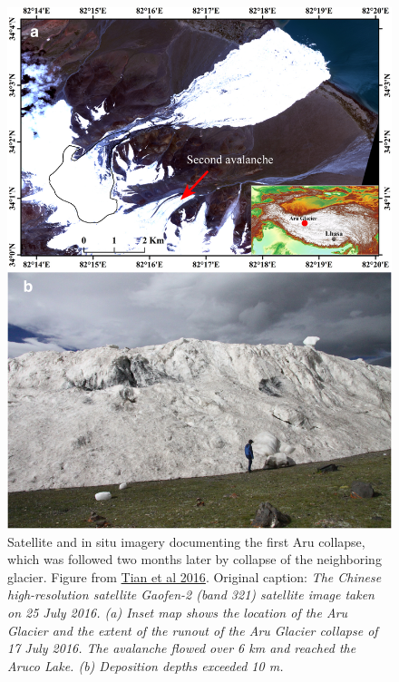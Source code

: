 \documentclass[12pt]{article}
\newenvironment{problem}[2][Problem]{\begin{trivlist}
\item[\hskip \labelsep {\bfseries #1}\hskip \labelsep {\bfseries #2.}]}{\end{trivlist}}
\begin{document}
\begin{problem}{2}
\begin{figure}
    \centering
    \includegraphics[width=0.7\linewidth]{figs/Tian-Figure_1.jpg}
    \caption{Satellite and in situ imagery documenting the first Aru collapse, which was followed two months later by collapse of the neighboring glacier. Figure from \href{https://www.cambridge.org/core/journals/journal-of-glaciology/article/two-glaciers-collapse-in-western-tibet/881D7526DCBCB83E45728829F13F802E}{Tian et al 2016}. Original caption: {\em The Chinese high-resolution satellite Gaofen-2 (band 321) satellite image taken on 25 July 2016. (a) Inset map shows the location of the Aru Glacier and the extent of the runout of the Aru Glacier collapse of 17 July 2016. The avalanche flowed over 6 km and reached the Aruco Lake. (b) Deposition depths exceeded 10 m.}}
    \label{fig:Aru_collapse}
\end{figure}

\end{problem}
\end{document}
